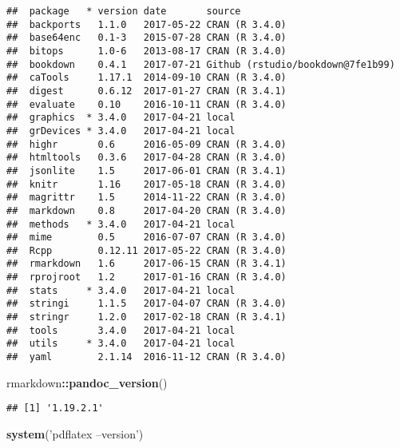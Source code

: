 \documentclass[]{article}
\newenvironment{Shaded}{\begin{snugshade}}{\end{snugshade}}
\newcommand{\KeywordTok}[1]{\textcolor[rgb]{0.13,0.29,0.53}{\textbf{#1}}}
\newcommand{\StringTok}[1]{\textcolor[rgb]{0.31,0.60,0.02}{#1}}
\newcommand{\OperatorTok}[1]{\textcolor[rgb]{0.81,0.36,0.00}{\textbf{#1}}}
\newcommand{\NormalTok}[1]{#1}
\begin{document}
\begin{verbatim}
##  package   * version date       source                           
##  backports   1.1.0   2017-05-22 CRAN (R 3.4.0)                   
##  base64enc   0.1-3   2015-07-28 CRAN (R 3.4.0)                   
##  bitops      1.0-6   2013-08-17 CRAN (R 3.4.0)                   
##  bookdown    0.4.1   2017-07-21 Github (rstudio/bookdown@7fe1b99)
##  caTools     1.17.1  2014-09-10 CRAN (R 3.4.0)                   
##  digest      0.6.12  2017-01-27 CRAN (R 3.4.1)                   
##  evaluate    0.10    2016-10-11 CRAN (R 3.4.0)                   
##  graphics  * 3.4.0   2017-04-21 local                            
##  grDevices * 3.4.0   2017-04-21 local                            
##  highr       0.6     2016-05-09 CRAN (R 3.4.0)                   
##  htmltools   0.3.6   2017-04-28 CRAN (R 3.4.0)                   
##  jsonlite    1.5     2017-06-01 CRAN (R 3.4.1)                   
##  knitr       1.16    2017-05-18 CRAN (R 3.4.0)                   
##  magrittr    1.5     2014-11-22 CRAN (R 3.4.0)                   
##  markdown    0.8     2017-04-20 CRAN (R 3.4.0)                   
##  methods   * 3.4.0   2017-04-21 local                            
##  mime        0.5     2016-07-07 CRAN (R 3.4.0)                   
##  Rcpp        0.12.11 2017-05-22 CRAN (R 3.4.0)                   
##  rmarkdown   1.6     2017-06-15 CRAN (R 3.4.1)                   
##  rprojroot   1.2     2017-01-16 CRAN (R 3.4.0)                   
##  stats     * 3.4.0   2017-04-21 local                            
##  stringi     1.1.5   2017-04-07 CRAN (R 3.4.0)                   
##  stringr     1.2.0   2017-02-18 CRAN (R 3.4.1)                   
##  tools       3.4.0   2017-04-21 local                            
##  utils     * 3.4.0   2017-04-21 local                            
##  yaml        2.1.14  2016-11-12 CRAN (R 3.4.0)
\end{verbatim}

\begin{Shaded}
\begin{Highlighting}[]
\NormalTok{rmarkdown}\OperatorTok{::}\KeywordTok{pandoc_version}\NormalTok{()}
\end{Highlighting}
\end{Shaded}

\begin{verbatim}
## [1] '1.19.2.1'
\end{verbatim}

\begin{Shaded}
\begin{Highlighting}[]
\KeywordTok{system}\NormalTok{(}\StringTok{'pdflatex --version'}\NormalTok{)}
\end{Highlighting}
\end{Shaded}
\end{document}
